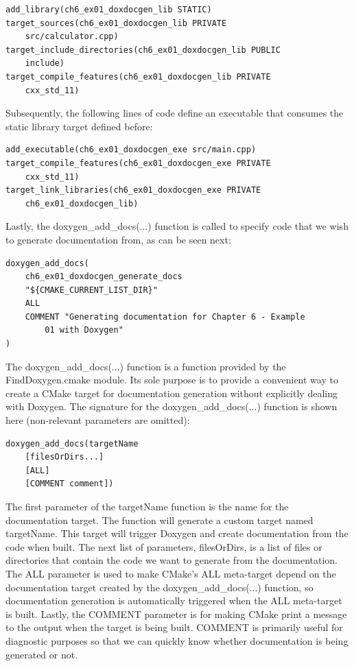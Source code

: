 \begin{lstlisting}[style=styleCMake]
add_library(ch6_ex01_doxdocgen_lib STATIC)
target_sources(ch6_ex01_doxdocgen_lib PRIVATE
	src/calculator.cpp)
target_include_directories(ch6_ex01_doxdocgen_lib PUBLIC
	include)
target_compile_features(ch6_ex01_doxdocgen_lib PRIVATE
	cxx_std_11)
\end{lstlisting}

Subsequently, the following lines of code define an executable that consumes the static library target defined before:

\begin{lstlisting}[style=styleCMake]
add_executable(ch6_ex01_doxdocgen_exe src/main.cpp)
target_compile_features(ch6_ex01_doxdocgen_exe PRIVATE
	cxx_std_11)
target_link_libraries(ch6_ex01_doxdocgen_exe PRIVATE
	ch6_ex01_doxdocgen_lib)
\end{lstlisting}

Lastly, the doxygen\_add\_docs(...) function is called to specify code that we wish to generate documentation from, as can be seen next:

\begin{lstlisting}[style=styleCMake]
doxygen_add_docs(
	ch6_ex01_doxdocgen_generate_docs
	"${CMAKE_CURRENT_LIST_DIR}"
	ALL
	COMMENT "Generating documentation for Chapter 6 - Example
		01 with Doxygen"
)
\end{lstlisting}
 
The doxygen\_add\_docs(...) function is a function provided by the FindDoxygen.cmake module. Its sole purpose is to provide a convenient way to create a CMake target for documentation generation without explicitly dealing with Doxygen. The signature for the doxygen\_add\_docs(...) function is shown here (non-relevant parameters are omitted):

\begin{lstlisting}[style=styleCMake]
doxygen_add_docs(targetName
	[filesOrDirs...]
	[ALL]
	[COMMENT comment])
\end{lstlisting}

The first parameter of the targetName function is the name for the documentation target. The function will generate a custom target named targetName. This target will trigger Doxygen and create documentation from the code when built. The next list of parameters, filesOrDirs, is a list of files or directories that contain the code we want to generate from the documentation. The ALL parameter is used to make CMake's ALL meta-target depend on the documentation target created by the doxygen\_add\_docs(...) function, so documentation generation is automatically triggered when the ALL meta-target is built. Lastly, the COMMENT parameter is for making CMake print a message to the output when the target is being built. COMMENT is primarily useful for diagnostic purposes so that we can quickly know whether documentation is being generated or not. 

